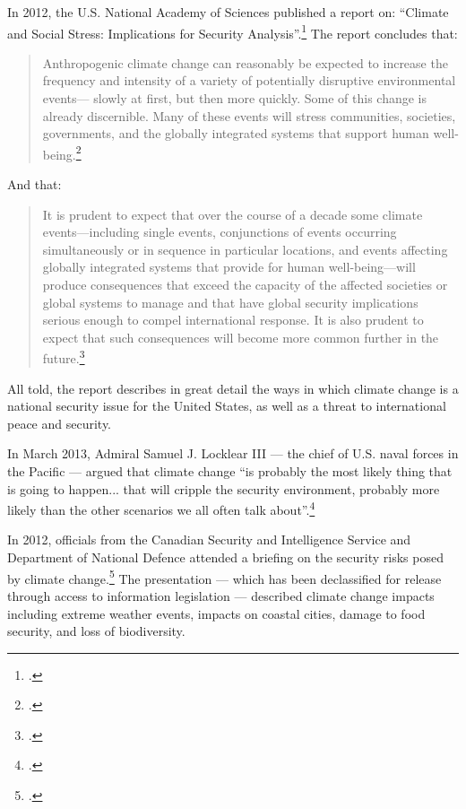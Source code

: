 In 2012, the U.S. National Academy of Sciences published a report on: ``Climate and Social Stress: Implications for Security Analysis''.\footcite[][]{SocialStress}
The report concludes that:
\begin{quote}
Anthropogenic climate change can reasonably be expected to increase the frequency and intensity of a variety of potentially disruptive environmental events— slowly at first, but then more quickly. Some of this change is already discernible. Many of these events will stress communities, societies, governments, and the globally integrated systems that support human well-being.\footcite[][p. S-2]{SocialStress}
\end{quote}
And that:
\begin{quote}
It is prudent to expect that over the course of a decade some climate events—including single events, conjunctions of events occurring simultaneously or in sequence in particular locations, and events affecting globally integrated systems that provide for human well-being—will produce consequences that exceed the capacity of the affected societies or global systems to manage and that have global security implications serious enough to compel international response. It is also prudent to expect that such consequences will become more common further in the future.\footcite[][p. S-4]{SocialStress}
\end{quote}
All told, the report describes in great detail the ways in which climate change is a national security issue for the United States, as well as a threat to international peace and security.


In March 2013, Admiral Samuel J. Locklear III --- the chief of U.S. naval forces in the Pacific --- argued that climate change ``is probably the most likely thing that is going to happen... that will cripple the security environment, probably more likely than the other scenarios we all often talk about''.\footcite[][]{PacificChiefWorry}



In 2012, officials from the Canadian Security and Intelligence Service and Department of National Defence attended a briefing on the security risks posed by climate change.\footcite[][]{CCSecurityBriefing}
The presentation --- which has been declassified for release through access to information legislation --- described climate change impacts including extreme weather events, impacts on coastal cities, damage to food security, and loss of biodiversity.



